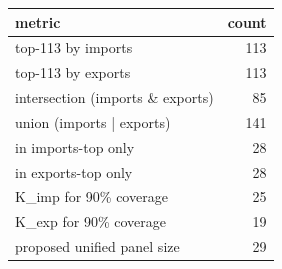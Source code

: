 \begin{tabular}{lr}
\toprule
metric & count \\
\midrule
top-113 by imports & 113 \\
top-113 by exports & 113 \\
intersection (imports \& exports) & 85 \\
union (imports | exports) & 141 \\
in imports-top only & 28 \\
in exports-top only & 28 \\
K\_imp for 90\% coverage & 25 \\
K\_exp for 90\% coverage & 19 \\
proposed unified panel size & 29 \\
\bottomrule
\end{tabular}

